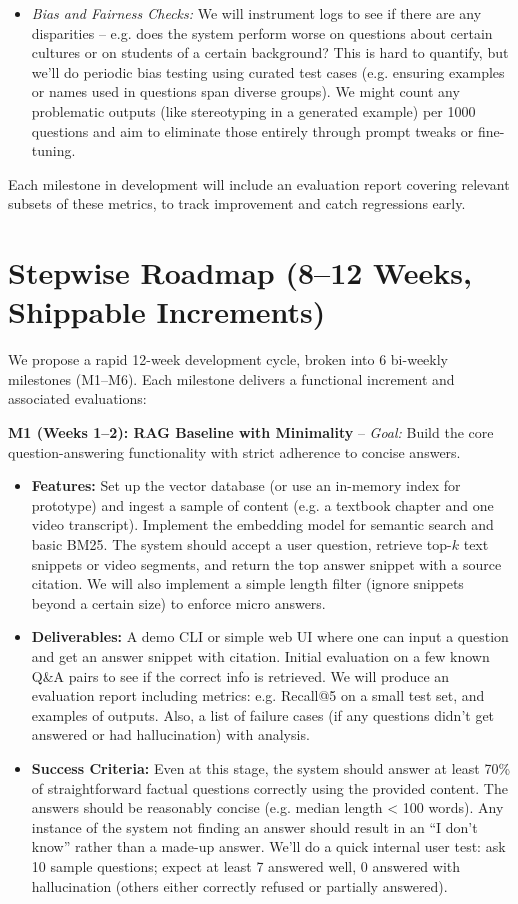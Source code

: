 \documentclass[11pt]{article}
\begin{document}
\begin{itemize}
\begin{itemize}
      \item \textit{Bias and Fairness Checks:} We will instrument logs to see if there are any disparities – e.g. does the system perform worse on questions about certain cultures or on students of a certain background? This is hard to quantify, but we’ll do periodic bias testing using curated test cases (e.g. ensuring examples or names used in questions span diverse groups). We might count any problematic outputs (like stereotyping in a generated example) per 1000 questions and aim to eliminate those entirely through prompt tweaks or fine-tuning.
    \end{itemize}
\end{itemize}
Each milestone in development will include an evaluation report covering relevant subsets of these metrics, to track improvement and catch regressions early.

\section{Stepwise Roadmap (8–12 Weeks, Shippable Increments)}
We propose a rapid 12-week development cycle, broken into 6 bi-weekly milestones (M1–M6). Each milestone delivers a functional increment and associated evaluations:

\textbf{M1 (Weeks 1–2): RAG Baseline with Minimality} – \textit{Goal:} Build the core question-answering functionality with strict adherence to concise answers.
  \begin{itemize}
    \item \textbf{Features:} Set up the vector database (or use an in-memory index for prototype) and ingest a sample of content (e.g. a textbook chapter and one video transcript). Implement the embedding model for semantic search and basic BM25. The system should accept a user question, retrieve top-$k$ text snippets or video segments, and return the top answer snippet with a source citation. We will also implement a simple length filter (ignore snippets beyond a certain size) to enforce micro answers.
    \item \textbf{Deliverables:} A demo CLI or simple web UI where one can input a question and get an answer snippet with citation. Initial evaluation on a few known Q\&A pairs to see if the correct info is retrieved. We will produce an evaluation report including metrics: e.g. Recall@5 on a small test set, and examples of outputs. Also, a list of failure cases (if any questions didn’t get answered or had hallucination) with analysis.
    \item \textbf{Success Criteria:} Even at this stage, the system should answer at least 70\% of straightforward factual questions correctly using the provided content. The answers should be reasonably concise (e.g. median length < 100 words). Any instance of the system not finding an answer should result in an “I don’t know” rather than a made-up answer. We’ll do a quick internal user test: ask 10 sample questions; expect at least 7 answered well, 0 answered with hallucination (others either correctly refused or partially answered).
  \end{itemize}
\end{document}
